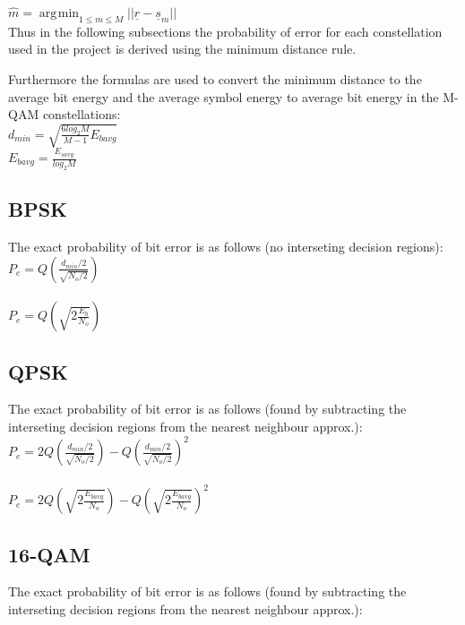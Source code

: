\documentclass[]{article}
\DeclareMathOperator*{\argmin}{\arg\!\min}
\begin{document}
$\hat{m} = \argmin_{1\leq m \leq M}{||\underline{r} - \underline{s}_m||}$ 
\\

Thus in the following subsections the probability of error for each constellation used in the project is derived using the minimum distance rule.

Furthermore the formulas are used to convert the minimum distance to the average bit energy and the average symbol energy to average bit energy in the M-QAM constellations:\\

$d_{min} = \sqrt{\frac{6log_2M}{M-1}E_{bavg}} $\\

$E_{bavg} = \frac{E_{savg}}{log_2M}$



\subsection{BPSK}
\label{sec:bpsk}
The exact probability of bit error is as follows (no interseting decision regions):\\

$ P_e = Q(\frac{d_{min}/2}{\sqrt{N_o/2}}) $ \\
\\
$ P_e = Q(\sqrt{2\frac{E_b}{N_o}}) $ \\

\subsection{QPSK}
\label{sec:qpsk}

The exact probability of bit error is as follows (found by subtracting the interseting decision regions from the nearest neighbour approx.):\\

$ P_e = 2Q(\frac{d_{min}/2}{\sqrt{N_o/2}})-Q(\frac{d_{min}/2}{\sqrt{N_o/2}})^2$ \\
\\
$ P_e = 2Q(\sqrt{2\frac{E_{bavg}}{N_o}})-Q(\sqrt{2\frac{E_{bavg}}{N_o}})^2$ \\

\subsection{16-QAM}
\label{sec:qam16}

The exact probability of bit error is as follows (found by subtracting the interseting decision regions from the nearest neighbour approx.):\\
\end{document}
